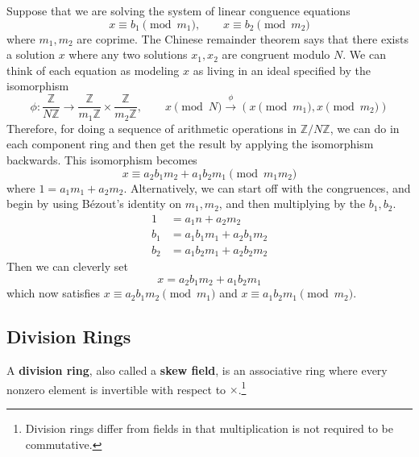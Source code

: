   \begin{example}
    \label{ex:chinese-remainder-theorem-on-integers}
    Suppose that we are solving the system of linear conguence equations 
    \begin{equation}
      x \equiv b_1 \pmod{m_1}, \qquad x \equiv b_2 \pmod{m_2}
    \end{equation}
    where $m_1, m_2$ are coprime. The Chinese remainder theorem says that there exists a solution $x$ where any two solutions $x_1, x_2$ are congruent modulo $N$. We can think of each equation as modeling $x$ as living in an ideal specified by the isomorphism 
    \begin{equation}
      \phi: \frac{\mathbb{Z}}{N\mathbb{Z}} \to \frac{\mathbb{Z}}{m_1 \mathbb{Z}} \times \frac{\mathbb{Z}}{m_2 \mathbb{Z}}, \qquad x \pmod{N} \xrightarrow{\phi} (x \pmod{m_1}, x \pmod{m_2})
    \end{equation}
    Therefore, for doing a sequence of arithmetic operations in $\mathbb{Z}/N\mathbb{Z}$, we can do in each component ring and then get the result by applying the isomorphism backwards. This isomorphism becomes 
    \begin{equation}
      x \equiv a_2 b_1 m_2 + a_1 b_2 m_1 \pmod{m_1 m_2}
    \end{equation}
    where $1 = a_1 m_1 + a_2 m_2$. Alternatively, we can start off with the congruences, and begin by using Bézout's identity on $m_1, m_2$, and then multiplying by the $b_1, b_2$. 
    \begin{align}
      1 & = a_1 n + a_2 m_2 \\
      b_1 & = a_1 b_1 m_1 + a_2 b_1 m_2 \\ 
      b_2 & = a_1 b_2 m_1 + a_2 b_2 m_2 
    \end{align}
    Then we can cleverly set 
    \begin{equation}
      x = a_2 b_1 m_2 + a_1 b_2 m_1
    \end{equation}
    which now satisfies $x \equiv a_2 b_1 m_2 \pmod{m_1}$ and $x \equiv a_1 b_2 m_1 \pmod{m_2}$. 
  \end{example} 

\subsection{Division Rings}

  \begin{definition}
    \label{def:division-ring}
    A \textbf{division ring}, also called a \textbf{skew field}, is an associative ring where every nonzero element is invertible with respect to $\times$.\footnote{Division rings differ from fields in that multiplication is not required to be commutative. }
  \end{definition}

